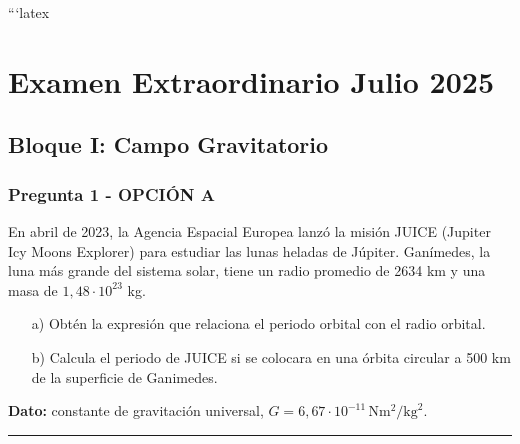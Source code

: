 ```latex
\chapter{Examen Extraordinario Julio 2025}
\label{chap:2025_jul_ext}

\section{Bloque I: Campo Gravitatorio}
\label{sec:grav_2025_jul_ext}

\subsection{Pregunta 1 - OPCIÓN A}
\label{subsec:1A_2025_jul_ext}

\begin{cajaenunciado}
En abril de 2023, la Agencia Espacial Europea lanzó la misión JUICE (Jupiter Icy Moons Explorer) para estudiar las lunas heladas de Júpiter. Ganímedes, la luna más grande del sistema solar, tiene un radio promedio de 2634 km y una masa de $1,48\cdot10^{23}$ kg.
\begin{enumerate}
    \item[a)] Obtén la expresión que relaciona el periodo orbital con el radio orbital.
    \item[b)] Calcula el periodo de JUICE si se colocara en una órbita circular a 500 km de la superficie de Ganimedes.
\end{enumerate}
\textbf{Dato:} constante de gravitación universal, $G=6,67\cdot10^{-11}\,\text{N}\text{m}^2/\text{kg}^2$.
\end{cajaenunciado}
\hrule

